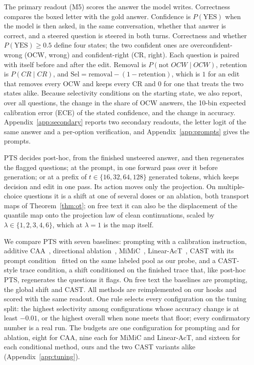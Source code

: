 \documentclass{article}
\newcommand{\ocw}{OCW}
\newcommand{\crok}{CR}
\begin{document}
The primary readout (M5) scores the answer the model writes. Correctness
compares the boxed letter with the gold answer. Confidence is
$P(\mathrm{YES})$ when the model is then asked, in the same conversation,
whether that answer is correct, and a steered question is steered in both
turns. Correctness and whether $P(\mathrm{YES})\ge0.5$ define four states;
the two confident ones are overconfident-wrong (\ocw{}, wrong) and
confident-right (\crok{}, right). Each question is paired with itself before
and after the edit. Removal is $P(\text{not }\ocw\mid\ocw)$, retention is
$P(\crok\mid\crok)$, and $\mathrm{Sel}=\text{removal}-(1-\text{retention})$,
which is $1$ for an edit that removes every \ocw{} and keeps every \crok{} and
$0$ for one that treats the two states alike. Because selectivity conditions on
the starting state, we also report, over all questions, the change in the share
of \ocw{} answers, the 10-bin expected calibration error (ECE) of the stated
confidence, and the change in accuracy. Appendix~\ref{app:secondary} reports
two secondary readouts, the letter logit of the same answer and a per-option
verification, and Appendix~\ref{app:prompts} gives the prompts.

PTS decides post-hoc, from the finished unsteered answer, and then regenerates
the flagged questions; at the prompt, in one forward pass over it before
generation; or at a prefix of $t\in\{16,32,64,128\}$ generated tokens, which
keeps decision and edit in one pass. Its action moves only the projection. On
multiple-choice questions it is a shift at one of several doses or an
ablation, both transport maps of Theorem~\ref{thm:ot}; on free text it can
also be the displacement of the quantile map onto the projection law of clean
continuations, scaled by $\lambda\in\{1,2,3,4,6\}$, which at $\lambda=1$ is
the map itself.

We compare PTS with seven baselines: prompting with a calibration instruction,
additive CAA~\citep{rimsky2024caa}, directional
ablation~\citep{arditi2024refusal}, MiMiC~\citep{singh2024mimic},
Linear-AcT~\citep{rodriguez2025act}, CAST with its prompt
condition~\citep{lee2024cast} fitted on the same labeled pool as our probe, and
a CAST-style trace condition, a shift conditioned on the finished trace that,
like post-hoc PTS, regenerates the questions it flags. On free text the
baselines are prompting, the global shift and CAST. All methods are
reimplemented on our hooks and scored with the same readout. One rule selects
every configuration on the tuning split: the highest selectivity among
configurations whose accuracy change is at least $-0.01$, or the highest
overall when none meets that floor; every confirmatory number is a real run.
The budgets are one configuration for prompting and for ablation, eight for
CAA, nine each for MiMiC and Linear-AcT, and sixteen for each conditional
method, ours and the two CAST variants alike (Appendix~\ref{app:tuning}).
\end{document}
